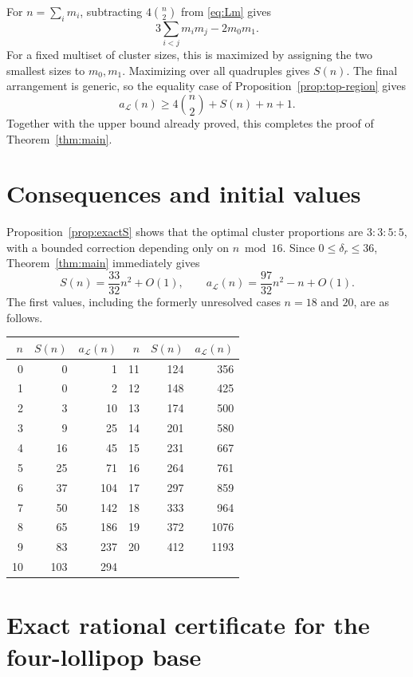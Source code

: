 \documentclass[11pt]{article}
\theoremstyle{plain}
\theoremstyle{definition}
\theoremstyle{remark}
\newcommand{\Lop}{\mathcal L}
\newcommand{\1}{\mathbf 1}
\begin{document}
For $n=\sum_i m_i$, subtracting $4\binom n2$ from \eqref{eq:Lm} gives
\[
 3\sum_{i<j}m_i m_j-2m_0m_1.
\]
For a fixed multiset of cluster sizes, this is maximized by assigning the two
smallest sizes to $m_0,m_1$.  Maximizing over all quadruples gives $S(n)$.
The final arrangement is generic, so the equality case of
Proposition~\ref{prop:top-region} gives
\[
 a_{\Lop}(n)\geq4\binom n2+S(n)+n+1.
\]
Together with the upper bound already proved, this completes the proof of
Theorem~\ref{thm:main}.

\section{Consequences and initial values}\label{sec:values}

Proposition~\ref{prop:exactS} shows that the optimal cluster proportions are
$3:3:5:5$, with a bounded correction depending only on $n\bmod16$.  Since
$0\leq\delta_r\leq36$, Theorem~\ref{thm:main} immediately gives
\[
 S(n)=\frac{33}{32}n^2+O(1),\qquad
 a_{\Lop}(n)=\frac{97}{32}n^2-n+O(1).
\]
The first values, including the formerly unresolved cases $n=18$ and $20$,
are as follows.

\begin{center}
\small
\begin{tabular}{@{}rrr@{\qquad}rrr@{}}
\toprule
$n$&$S(n)$&$a_{\Lop}(n)$&$n$&$S(n)$&$a_{\Lop}(n)$\\
\midrule
0&0&1&11&124&356\\
1&0&2&12&148&425\\
2&3&10&13&174&500\\
3&9&25&14&201&580\\
4&16&45&15&231&667\\
5&25&71&16&264&761\\
6&37&104&17&297&859\\
7&50&142&18&333&964\\
8&65&186&19&372&1076\\
9&83&237&20&412&1193\\
10&103&294&&&\\
\bottomrule
\end{tabular}
\end{center}

\appendix

\section{Exact rational certificate for the four-lollipop base}
\label{app:certificate}
\end{document}
